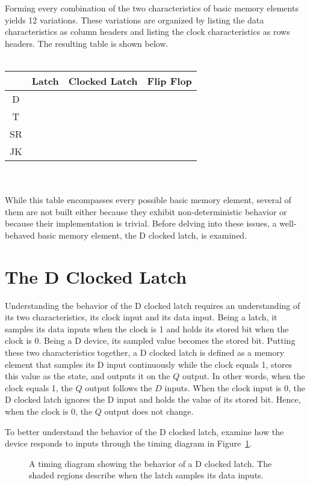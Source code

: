 Forming every combination of the two characteristics of basic
memory elements yields 12 variations.  These variations are
organized by listing the data characteristics as column 
headers and listing the clock characteristics as rows headers.
The resulting table is shown below.
\\ \\
\begin{tabular}{|c|c|c|c|}\hline
   &  Latch & Clocked Latch  & Flip Flop   \\ \hline
D  &        &	  &	\\ \hline
T  &        &     &	\\ \hline
SR &	    &	  &	\\ \hline
JK &        &     &	\\ \hline
\end{tabular}
\\ \\
While this table encompasses every possible basic memory 
element, several of them are not built either because they
exhibit non-deterministic behavior or because their implementation
is trivial.  Before delving into these issues, a well-behaved basic memory 
element, the D clocked latch, is examined.


\section{The D Clocked Latch}
Understanding the behavior of the D clocked latch requires
an understanding of its two characteristics, its clock
input and its data input.  Being a latch, it samples its
data inputs when the clock is 1 and holds its stored bit
when the clock is 0.  Being a D device, its sampled value
becomes the stored bit. Putting these two characteristics 
together, a D clocked latch is defined as a memory
element that samples its D input continuously while the clock 
equals 1, stores this value as the state, and outputs it on 
the $Q$ output.  In other words, when the clock equals 1, the
$Q$ output follows the $D$ inputs. When the clock input is 0, 
the D clocked latch ignores the D input and holds the value 
of its stored bit.  Hence, when the clock is 0, the
$Q$ output does not change.

To better understand the behavior of the D clocked latch, 
examine how the device responds to inputs through 
the timing diagram in Figure~\ref{fig:sequentialCirDCL}.

\begin{figure}[ht]
\caption{A timing diagram showing the behavior of a D clocked latch.
The shaded regions describe when the latch samples its data inputs.}
\label{fig:sequentialCirDCL}
\end{figure}


